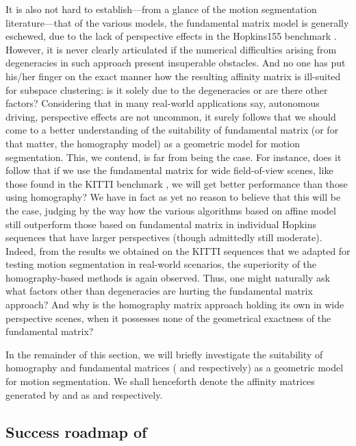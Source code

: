 \documentclass[10pt,twocolumn,letterpaper]{article}
\begin{document}
It is also not hard to establish---from a glance of the motion segmentation literature---that of the various models, the fundamental matrix model is generally eschewed, due to the lack of perspective effects in the Hopkins155 benchmark \cite{Tron2007}. However, it is never clearly articulated if the numerical difficulties arising from degeneracies in such approach present insuperable obstacles. And no one has put his/her finger on the exact manner how the resulting affinity matrix is ill-suited for subspace clustering: is it solely due to the degeneracies or are there other factors? Considering that in many real-world applications say, autonomous driving, perspective effects are not uncommon, it surely follows that we should come to a better understanding of the suitability of fundamental matrix (or for that matter, the homography model) as a geometric model for motion segmentation. This, we contend, is far from being the case. For instance, does it follow that if we use the fundamental matrix for wide field-of-view scenes, like those found in the KITTI benchmark \cite{Geiger2013IJRR}, we will get better performance than those using homography? We have in fact as yet no reason to believe that this will be the case, judging by the way how the various algorithms based on affine model still outperform those based on fundamental matrix in individual Hopkins sequences that have larger perspectives (though admittedly still moderate). Indeed, from the results we obtained on the KITTI sequences that we adapted for testing motion segmentation in real-world scenarios, the superiority of the homography-based methods is again observed. Thus, one might naturally ask what factors other than degeneracies are hurting the fundamental matrix approach? And why is the homography matrix approach holding its own in wide perspective scenes, when it possesses none of the geometrical exactness of the fundamental matrix? 

In the remainder of this section, we will briefly investigate the suitability of homography and fundamental matrices ( and  respectively) as a geometric model for motion segmentation. We shall henceforth denote the affinity matrices generated by  and  as  and  respectively.

\subsection{Success roadmap of }
\end{document}
